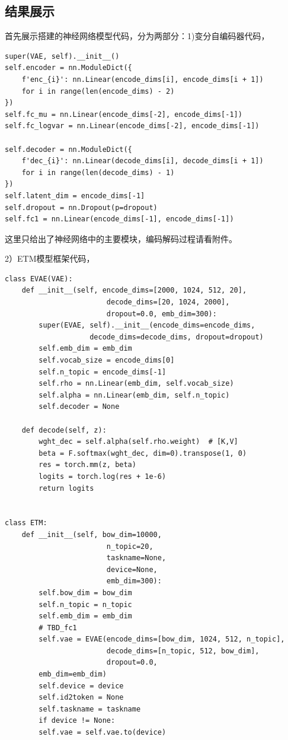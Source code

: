 \documentclass[twocolumn]{article}
\begin{document}
\subsection{结果展示}
    首先展示搭建的神经网络模型代码，分为两部分：1)变分自编码器代码，
\begin{verbatim}
super(VAE, self).__init__()
self.encoder = nn.ModuleDict({
    f'enc_{i}': nn.Linear(encode_dims[i], encode_dims[i + 1])
    for i in range(len(encode_dims) - 2)
})
self.fc_mu = nn.Linear(encode_dims[-2], encode_dims[-1])
self.fc_logvar = nn.Linear(encode_dims[-2], encode_dims[-1])

self.decoder = nn.ModuleDict({
    f'dec_{i}': nn.Linear(decode_dims[i], decode_dims[i + 1])
    for i in range(len(decode_dims) - 1)
})
self.latent_dim = encode_dims[-1]
self.dropout = nn.Dropout(p=dropout)
self.fc1 = nn.Linear(encode_dims[-1], encode_dims[-1])
\end{verbatim}
    这里只给出了神经网络中的主要模块，编码解码过程请看附件。
    
    2）ETM模型框架代码，
\begin{verbatim}
class EVAE(VAE):
    def __init__(self, encode_dims=[2000, 1024, 512, 20], 
                        decode_dims=[20, 1024, 2000], 
                        dropout=0.0, emb_dim=300):
        super(EVAE, self).__init__(encode_dims=encode_dims,
                    decode_dims=decode_dims, dropout=dropout)
        self.emb_dim = emb_dim
        self.vocab_size = encode_dims[0]
        self.n_topic = encode_dims[-1]
        self.rho = nn.Linear(emb_dim, self.vocab_size)
        self.alpha = nn.Linear(emb_dim, self.n_topic)
        self.decoder = None

    def decode(self, z):
        wght_dec = self.alpha(self.rho.weight)  # [K,V]
        beta = F.softmax(wght_dec, dim=0).transpose(1, 0)
        res = torch.mm(z, beta)
        logits = torch.log(res + 1e-6)
        return logits


class ETM:
    def __init__(self, bow_dim=10000, 
                        n_topic=20, 
                        taskname=None, 
                        device=None, 
                        emb_dim=300):
        self.bow_dim = bow_dim
        self.n_topic = n_topic
        self.emb_dim = emb_dim
        # TBD_fc1
        self.vae = EVAE(encode_dims=[bow_dim, 1024, 512, n_topic],
                        decode_dims=[n_topic, 512, bow_dim], 
                        dropout=0.0,
        emb_dim=emb_dim)
        self.device = device
        self.id2token = None
        self.taskname = taskname
        if device != None:
        self.vae = self.vae.to(device)
\end{verbatim}
	
\end{document}
